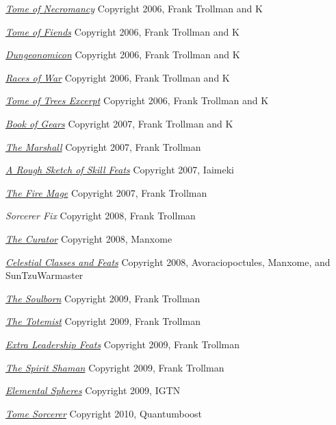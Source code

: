 \begin{small}
\begin{enumerate}
\href{http://www.tgdmb.com/viewtopic.php?t=34248}{\textit{Tome of Necromancy}} Copyright 2006, Frank Trollman and K

\href{http://www.tgdmb.com/viewtopic.php?t=28828}{\textit{Tome of Fiends}} Copyright 2006, Frank Trollman and K

\href{http://www.tgdmb.com/viewtopic.php?t=28547}{\textit{Dungeonomicon}} Copyright 2006, Frank Trollman and K

\href{http://www.tgdmb.com/viewtopic.php?t=33294}{\textit{Races of War}} Copyright 2006, Frank Trollman and K

\href{http://www.tgdmb.com/viewtopic.php?p=28856#28856}{\textit{Tome of Trees Excerpt}} Copyright 2006, Frank Trollman and K

\href{http://www.tgdmb.com/viewtopic.php?t=35813}{\textit{Book of Gears}} Copyright 2007, Frank Trollman and K

\href{http://www.tgdmb.com/viewtopic.php?p=24348#24348}{\textit{The Marshall}} Copyright 2007, Frank Trollman

\href{http://www.tgdmb.com/viewtopic.php?p=29298}{\textit{A Rough Sketch of Skill Feats}} Copyright 2007, Iaimeki

\href{http://www.tgdmb.com/viewtopic.php?p=40226#40226}{\textit{The Fire Mage}} Copyright 2007, Frank Trollman

\textit{Sorcerer Fix} Copyright 2008, Frank Trollman

\href{http://www.tgdmb.com/viewtopic.php?t=49091}{\textit{The Curator}} Copyright 2008, Manxome

\href{http://www.tgdmb.com/viewtopic.php?t=49848}{\textit{Celestial Classes and Feats}} Copyright 2008, Avoraciopoctules, Manxome, and SunTzuWarmaster

\href{http://www.tgdmb.com/viewtopic.php?t=50472}{\textit{The Soulborn}} Copyright 2009, Frank Trollman

\href{http://www.tgdmb.com/viewtopic.php?t=50483}{\textit{The Totemist}} Copyright 2009, Frank Trollman

\href{http://tgdmb.com/viewtopic.php?t=50544}{\textit{Extra Leadership Feats}} Copyright 2009, Frank Trollman

\href{http://www.tgdmb.com/viewtopic.php?p=105974#105974}{\textit{The Spirit Shaman}} Copyright 2009, Frank Trollman

\href{http://dndwiki.com/wiki/Elemental_Spheres_(3.5e_Other)}{\textit{Elemental Spheres}} Copyright 2009, IGTN

\href{http://dndwiki.com/wiki/Sorcerer,_Tome_(3.5e_Class)}{\textit{Tome Sorcerer}} Copyright 2010,  Quantumboost


\end{enumerate}
\end{small}
